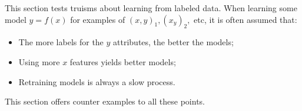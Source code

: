 \documentclass[AMA,STIX2COL]{WileyNJDv5}
\begin{document}
This section tests  truisms about learning
from labeled data. 
When learning some model $y=f(x)$ for examples of $(x,y)_1, (x_y)_2,$ etc,
it is often assumed that:
\begin{itemize}
\item
The  more labels for the $y$ attributes, the better the models;
\item 
Using 
more  $x$ features yields better models;
\item
Retraining models is always  a slow process.
\end{itemize}
This section offers counter examples to all these points.
\end{document}
